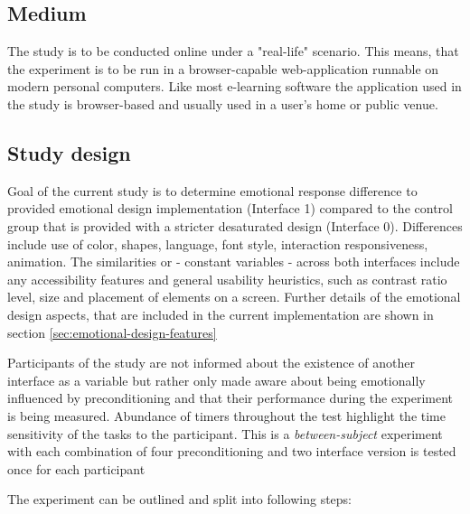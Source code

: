 	\subsection{Medium}
	
	The study is to be conducted online under a "real-life" scenario. This means, that the experiment is to be run in a browser-capable web-application runnable on modern personal computers. Like most e-learning software the  application used in the study is browser-based and usually used in a user's home or public venue.
	
	\subsection{Study design} \label{sec:study-design}
	
	Goal of the current study is to determine emotional response difference to provided emotional design implementation (Interface 1) compared to the control group that is provided with a stricter desaturated design (Interface 0). Differences include use of color, shapes, language, font style, interaction responsiveness, animation. The similarities or - constant variables - across both interfaces include any accessibility features and general usability heuristics, such as contrast ratio level, size and placement of elements on a screen. Further details of the emotional design aspects, that are included in the current implementation are shown in section \ref{sec:emotional-design-features}
	
	Participants of the study are not informed about the existence of another interface as a variable but rather only made aware about being emotionally influenced by preconditioning and that their performance during the experiment is being measured. Abundance of timers throughout the test highlight the time sensitivity of the tasks to the participant. This is a \textit{between-subject} experiment with each combination of four preconditioning and two interface version is tested once for each participant
	
	The experiment can be outlined and split into following steps:
	
